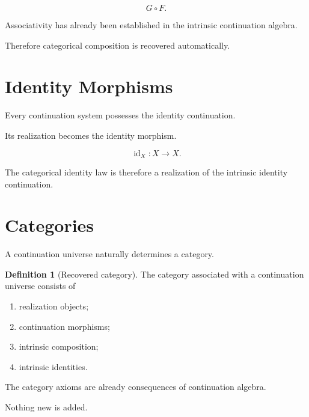 \documentclass[13pt,openany]{book}
\theoremstyle{plain}
\theoremstyle{definition}
\newtheorem{definition}{Definition}[chapter]
\begin{document}
\[
G\circ F.
\]

Associativity has already been established in the intrinsic continuation
algebra.

Therefore categorical composition is recovered automatically.

\section{Identity Morphisms}

Every continuation system possesses the identity continuation.

Its realization becomes the identity morphism.

\[
\operatorname{id}_X:X\rightarrow X.
\]

The categorical identity law is therefore a realization of the intrinsic
identity continuation.

\section{Categories}

A continuation universe naturally determines a category.

\begin{definition}[Recovered category]
The category associated with a continuation universe consists of

\begin{enumerate}
\item realization objects;

\item continuation morphisms;

\item intrinsic composition;

\item intrinsic identities.
\end{enumerate}
\end{definition}

The category axioms are already consequences of continuation algebra.

Nothing new is added.

\end{document}
